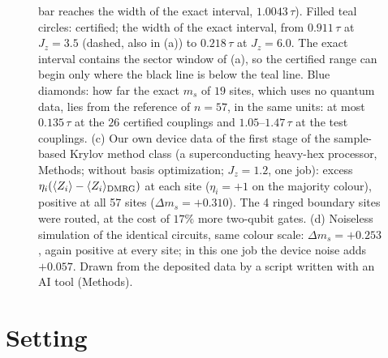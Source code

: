 \documentclass[aps,prx,twocolumn,10pt,superscriptaddress,nofootinbib,longbibliography,floatfix]{revtex4-2}
\theoremstyle{remark}
\newcommand{\Jz}{J_z}
\newcommand{\ms}{m_s}
\begin{document}
\begin{figure}[t]
{bar reaches the width of the exact interval, $1.0043\,\tau$). Filled teal circles: certified; the width of the exact %
interval, from $0.911\,\tau$ at $\Jz=3.5$ (dashed, also in (a)) to $0.218\,\tau$ at $\Jz=6.0$. The exact interval %
contains the sector window of (a), so the certified range can begin only where the black line is below the teal
line.
Blue diamonds: how far the exact $\ms$ of $19$ sites, which uses no quantum data, lies from the reference of
$n=57$, in the same units: at most $0.135\,\tau$ at the $26$ certified couplings and $1.05$--$1.47\,\tau$ at the %
test couplings.
(c) Our own device data of the first stage of the sample-based Krylov method class (a superconducting heavy-hex processor, Methods;
without basis optimization; $\Jz=1.2$, one job): excess $\eta_i(\langle Z_i\rangle-\langle Z_i\rangle_{\rm DMRG})$ at %
each site ($\eta_i=+1$ on the majority colour), positive at all 57 sites ($\Delta\ms=+0.310$). The 4 ringed boundary %
sites were routed, at the cost of $17\%$ more two-qubit gates. %
(d) Noiseless simulation of the identical circuits, same colour scale: $\Delta\ms=+0.253$, again positive at every %
site; in this one job the device noise adds $+0.057$. %
Drawn from the deposited data by a script written with an AI tool (Methods).}
\end{figure}

\section{Setting}
\label{sec:setting}
\end{document}
